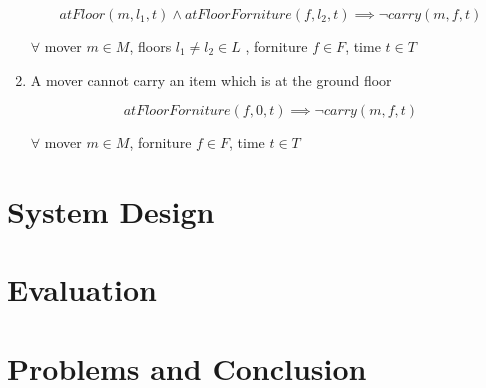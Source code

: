 \documentclass[a4paper, 11pt]{article}
\begin{document}
\begin{enumerate}
    $$atFloor(m, l_1,t) \land atFloorForniture(f, l_2, t) \implies \lnot carry(m, f, t)$$

    $\forall$ mover $m \in M$, floors $l_1 \neq l_2 \in L$ , forniture $f \in F$, time $t \in T$

    \item A mover cannot carry an item which is at the ground floor

    $$atFloorForniture(f, 0, t) \implies \lnot carry(m, f, t)$$

    $\forall$ mover $m \in M$, forniture $f \in F$, time $t \in T$
    
    
\end{enumerate}

\pagebreak

\section{System Design}

\pagebreak

\section{Evaluation}

\pagebreak

\section{Problems and Conclusion}


\end{document}
